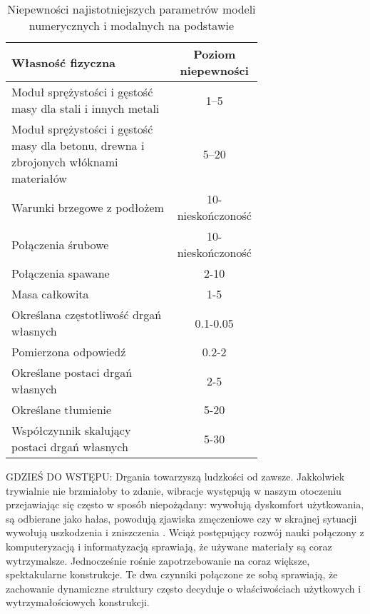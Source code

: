 \begin{table} 
	\label{table:uncertainitesModel}
	\centering
	\caption{Niepewności najistotniejszych parametrów modeli numerycznych i modalnych na podstawie \cite{Brincker2015}}
	\begin{tabular}{p{0.7\linewidth} | c}
		\toprule 
		Własność fizyczna   & Poziom niepewności \\
		\midrule
		Moduł sprężystości i gęstość masy dla stali i innych metali  &    1--5    \\
		Moduł sprężystości i gęstość masy dla betonu, drewna i zbrojonych włóknami materiałów & 5--20\\
		Warunki brzegowe z podłożem &    10-nieskończoność     \\
		Połączenia śrubowe & 10-nieskończoność\\
		Połączenia spawane & 2-10\\
		Masa całkowita & 1-5 \\
		Określana częstotliwość drgań własnych & 0.1-0.05\\
		Pomierzona odpowiedź & 0.2-2\\
		Określane postaci drgań własnych & 2-5\\ 
		Określane tłumienie & 5-20\\
		Współczynnik skalujący postaci drgań własnych & 5-30\\
		\bottomrule
	\end{tabular}
\end{table}



GDZIEŚ DO WSTĘPU: Drgania towarzyszą ludzkości od zawsze. Jakkolwiek trywialnie nie brzmiałoby to zdanie, wibracje występują w naszym otoczeniu przejawiając się często w sposób niepożądany: wywołują dyskomfort użytkowania, są odbierane jako hałas, powodują zjawiska zmęczeniowe czy w skrajnej sytuacji wywołują uszkodzenia i zniszczenia \parencite{Maia1997}. Wciąż postępujący rozwój nauki połączony z komputeryzacją i informatyzacją sprawiają, że używane materiały są coraz wytrzymalsze. Jednocześnie rośnie zapotrzebowanie na coraz większe, spektakularne konstrukcje. Te dwa czynniki połączone ze sobą sprawiają, że zachowanie dynamiczne struktury często decyduje o właściwościach użytkowych i wytrzymałościowych konstrukcji. 


